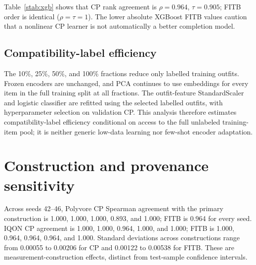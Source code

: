 \documentclass[preprint,12pt]{elsarticle}
\begin{document}
\begin{table}[htbp]
\caption{IQON logistic versus XGBoost robustness over the same PCA-256 outfit features.}
\label{stab:xgb}
\centering\small
{}
\end{table}

Table~\ref{stab:xgb} shows that CP rank agreement is $\rho=0.964$, $\tau=0.905$; FITB order is identical ($\rho=\tau=1$). The lower absolute XGBoost FITB values caution that a nonlinear CP learner is not automatically a better completion model.

\subsection{Compatibility-label efficiency}

The 10\%, 25\%, 50\%, and 100\% fractions reduce only labelled training outfits. Frozen encoders are unchanged, and PCA continues to use embeddings for every item in the full training split at all fractions. The outfit-feature StandardScaler and logistic classifier are refitted using the selected labelled outfits, with hyperparameter selection on validation CP. This analysis therefore estimates compatibility-label efficiency conditional on access to the full unlabeled training-item pool; it is neither generic low-data learning nor few-shot encoder adaptation.

\section{Construction and provenance sensitivity}

Across seeds 42--46, Polyvore CP Spearman agreement with the primary construction is 1.000, 1.000, 1.000, 0.893, and 1.000; FITB is 0.964 for every seed. IQON CP agreement is 1.000, 1.000, 0.964, 1.000, and 1.000; FITB is 1.000, 0.964, 0.964, 0.964, and 1.000. Standard deviations across constructions range from 0.00055 to 0.00206 for CP and 0.00122 to 0.00538 for FITB. These are measurement-construction effects, distinct from test-sample confidence intervals.
\end{document}
